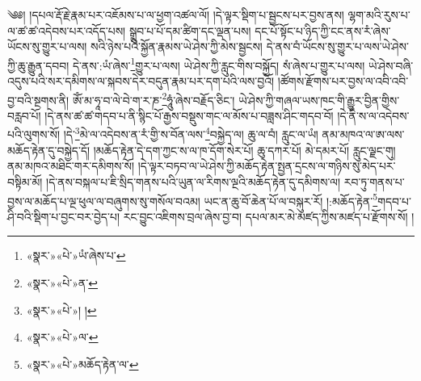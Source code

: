 ༄༅། །དཔལ་རྡོ་རྗེ་རྣམ་པར་འཇོམས་པ་ལ་ཕྱག་འཚལ་ལོ། །དེ་ལྟར་སྡིག་པ་སྦྱངས་པར་བྱས་ནས། ལྷག་མའི་རུས་པ་ལ་ཚ་ཚ་འདེབས་པར་འདོད་པས། སྒྲུབ་པ་པོ་དམ་ཚིག་དང་ལྡན་པས། དང་པོ་སྟོང་པ་ཉིད་ཀྱི་ངང་ནས་རཾ་ཞེས་ཡོངས་སུ་གྱུར་པ་ལས། སའི་ཉེས་པའི་སྐྱོན་རྣམས་ཡེ་ཤེས་ཀྱི་མེས་སྦྱངས། དེ་ནས་བཾ་ཡོངས་སུ་གྱུར་པ་ལས་ཡེ་ཤེས་ཀྱི་ཆུ་རྒྱུན་དབབ། དེ་ནས་:ཡཾ་ཞེས་\footnote{«སྣར་»«པེ་»ཡཾ་ཞེས་པ་}གྱུར་པ་ལས། ཡེ་ཤེས་ཀྱི་རླུང་གིས་བསྐྱོད། སཾ་ཞེས་པ་གྱུར་པ་ལས། ཡེ་ཤེས་བཞི་འདུས་པའི་སར་དམིགས་ལ་སྐབས་དེར་བདུན་རྣམ་པར་དག་པའི་ལས་བྱའོ། །ཚོགས་རྫོགས་པར་བྱས་ལ་འབི་འབི་བྱ་བའི་སྔགས་ནི། ཨོཾ་མ་ཧཱ་བ་ལེ་བེ་ག་ར་ཎ་\footnote{«སྣར་»«པེ་»ན་}ཧཱུཾ་ཞེས་བརྗོད་ཅིང་། ཡེ་ཤེས་ཀྱི་གཞལ་ཡས་ཁང་གི་རྒྱུར་བྱིན་གྱིས་བརླབ་པོ། །དེ་ནས་ཚ་ཚ་གདབ་པ་ནི་སྙིང་པོ་རྒྱས་བསྡུས་གང་ལ་མོས་པ་བཟླས་ཤིང་གདབ་བོ། །དེ་ནི་ས་ལ་འདེབས་པའི་ལུགས་སོ། །དེ་\footnote{«སྣར་»«པེ་»། །}མེ་ལ་འདེབས་ན་རཾ་གྱི་ས་བོན་ལས་\footnote{«སྣར་»«པེ་»ལ་}བསྐྱེད་ལ། ཆུ་ལ་བཾ། རླུང་ལ་ཡཾ། ནམ་མཁའ་ལ་ཨ་ལས་མཆོད་རྟེན་དུ་བསྐྱེད་དོ། །མཆོད་རྟེན་དེ་དག་ཀྱང་ས་ལ་ཁ་དོག་སེར་པོ། ཆུ་དཀར་པོ། མེ་དམར་པོ། རླུང་ལྗང་གུ། ནམ་མཁའ་མཐིང་གར་དམིགས་སོ། །དེ་ལྟར་བཏབ་ལ་ཡེ་ཤེས་ཀྱི་མཆོད་རྟེན་སྤྱན་དྲངས་ལ་གཉིས་སུ་མེད་པར་བསྟིམ་མོ། །དེ་ནས་བསྐལ་པ་ཇི་སྲིད་གནས་པའི་ཡུན་ལ་རིགས་ལྔའི་མཆོད་རྟེན་དུ་དམིགས་ལ། རབ་ཏུ་གནས་པ་བྱས་ལ་མཆོད་པ་ལྔ་ཕུལ་ལ་བཞུགས་སུ་གསོལ་བའམ། ཡང་ན་ཆུ་བོ་ཆེན་པོ་ལ་བསྐུར་རོ། །:མཆོད་རྟེན་\footnote{«སྣར་»«པེ་»མཆོད་རྟེན་ལ་}གདབ་པ་ཤི་བའི་སྡིག་པ་བྱང་བར་བྱེད་པ། རང་བྱུང་འཇིགས་བྲལ་ཞེས་བྱ་བ། དཔལ་མར་མེ་མཛད་ཀྱིས་མཛད་པ་རྫོགས་སོ། ། 